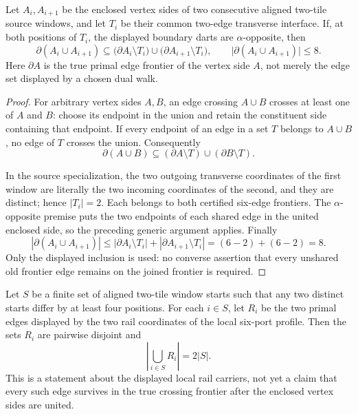 \begin{lemma}
\label{lem:source-two-window-serial-frontier}
Let \(A_i,A_{i+1}\) be the enclosed vertex sides of two consecutive aligned
two-tile source windows, and let \(T_i\) be their common two-edge transverse
interface.  If, at both positions of \(T_i\), the displayed boundary darts
are \(\alpha\)-opposite, then
\[
  \partial(A_i\cup A_{i+1})
  \subseteq
  \bigl(\partial A_i\setminus T_i\bigr)
  \cup
  \bigl(\partial A_{i+1}\setminus T_i\bigr),
  \qquad
  \bigl|\partial(A_i\cup A_{i+1})\bigr|\le 8.
\]
Here \(\partial A\) is the true primal edge frontier of the vertex side
\(A\), not merely the edge set displayed by a chosen dual walk.
\end{lemma}

\begin{proof}
For arbitrary vertex sides \(A,B\), an edge crossing \(A\cup B\) crosses at
least one of \(A\) and \(B\): choose its endpoint in the union and retain the
constituent side containing that endpoint.  If every endpoint of an edge in
a set \(T\) belongs to \(A\cup B\), no edge of \(T\) crosses the union.
Consequently
\[
  \partial(A\cup B)
  \subseteq
  (\partial A\setminus T)\cup(\partial B\setminus T).
\]

In the source specialization, the two outgoing transverse coordinates of
the first window are literally the two incoming coordinates of the second,
and they are distinct; hence \(|T_i|=2\).  Each belongs to both certified
six-edge frontiers.  The \(\alpha\)-opposite premise puts the two endpoints
of each shared edge in the united enclosed side, so the preceding generic
argument applies.  Finally
\[
  |\partial(A_i\cup A_{i+1})|
  \le |\partial A_i\setminus T_i|
     +|\partial A_{i+1}\setminus T_i|
  =(6-2)+(6-2)=8.
\]
Only the displayed inclusion is used: no converse assertion that every
unshared old frontier edge remains on the joined frontier is required.
\end{proof}

\begin{lemma}
\label{lem:source-local-rail-support-growth}
Let \(S\) be a finite set of aligned two-tile window starts such that any two
distinct starts differ by at least four positions.  For each \(i\in S\), let
\(R_i\) be the two primal edges displayed by the two rail coordinates of the
local six-port profile.  Then the sets \(R_i\) are pairwise disjoint and
\[
                         \left|\bigcup_{i\in S}R_i\right|=2|S|.
\]
This is a statement about the displayed local rail carriers, not yet a claim
that every such edge survives in the true crossing frontier after the
enclosed vertex sides are united.
\end{lemma}

